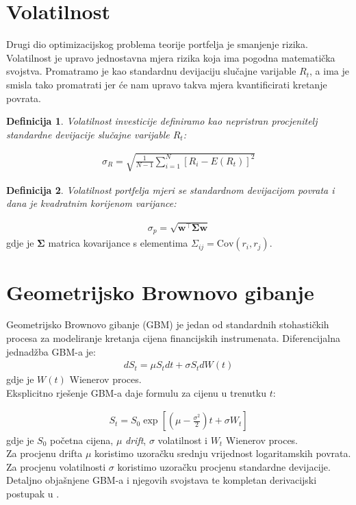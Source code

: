 \documentclass[zavrsnirad, upload]{fer}
\newtheorem{definition}{Definicija}
\begin{document}
\section{Volatilnost}
Drugi dio optimizacijskog problema teorije portfelja je smanjenje rizika.
Volatilnost je upravo jednostavna mjera rizika koja ima pogodna matematička svojstva.
Promatramo je kao standardnu devijaciju slučajne varijable $R_t$, a ima je smisla tako promatrati
jer će nam upravo takva mjera kvantificirati kretanje povrata.
\begin{definition}
	Volatilnost investicije definiramo kao nepristran procjenitelj
	standardne devijacije slučajne varijable $R_t$:
\end{definition}
\begin{align}
	\sigma_R = \sqrt{\frac{1}{N - 1} \sum_{i = 1}^{N} \left[R_i - E(R_t)\right]^2}
\end{align}
\begin{definition}
Volatilnost portfelja mjeri se standardnom devijacijom povrata i dana je kvadratnim korijenom varijance:
\end{definition}
\begin{align}
\sigma_p = \sqrt{\mathbf{w}^\intercal \boldsymbol{\Sigma} \mathbf{w}}
\end{align}
\indent gdje je $\boldsymbol{\Sigma}$ matrica kovarijance s elementima $\Sigma_{ij} = \text{Cov}(r_i, r_j)$.

\section{Geometrijsko Brownovo gibanje}
\label{sek:gbm}
Geometrijsko Brownovo gibanje (GBM) je jedan od standardnih
stohastičkih procesa za modeliranje kretanja cijena financijskih instrumenata.
Diferencijalna jednadžba GBM-a je:
\begin{align}
    dS_t = \mu S_t dt + \sigma S_t dW\left(t\right)
\end{align}
\indent gdje je $W\left(t\right)$ Wienerov proces.\\
Eksplicitno rješenje GBM-a daje formulu za cijenu u trenutku $t$:

\begin{align}
S_t = S_0 \exp\left[\left(\mu - \frac{\sigma^2}{2}\right)t +
    \sigma W_t\right] \label{eq:gbm}
\end{align}
\indent gdje je $S_0$ početna cijena, $\mu$ \textit{drift}, $\sigma$ volatilnost i $W_t$
Wienerov proces.\\
\indent Za procjenu drifta $\mu$ koristimo uzoračku srednju vrijednost
logaritamskih povrata.\\
\indent Za procjenu volatilnosti $\sigma$ koristimo uzoračku
procjenu standardne devijacije.\\
Detaljno objašnjene GBM-a i njegovih svojstava te kompletan derivacijski
postupak u \cite{GMBIzvod}.
\end{document}
